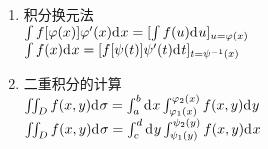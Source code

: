 \begin{enumerate}


\item 积分换元法\\
$\int f[\varphi(x)]\varphi'(x){\mathrm{d}\:\!} x=[\int f(u){\mathrm{d}\:\!} u]_{u=\varphi(x)}$\\
$\int f(x){\mathrm{d}\:\!} x=[f[\psi(t)]\psi'(t){\mathrm{d}\:\!} t]_{t=\psi^{-1}(x)}$

\item 二重积分的计算\\
$\iint_D f(x,y){\mathrm{d}\:\!}\sigma=\int_a^b{\mathrm{d}\:\!} x\int_{\varphi_1(x)}^{\varphi_2(x)}f(x,y){\mathrm{d}\:\!} y$\\
$\iint_D f(x,y){\mathrm{d}\:\!}\sigma=\int_c^d{\mathrm{d}\:\!} y\int_{\psi_1(y)}^{\psi_2(y)}f(x,y){\mathrm{d}\:\!} x$

\end{enumerate}
